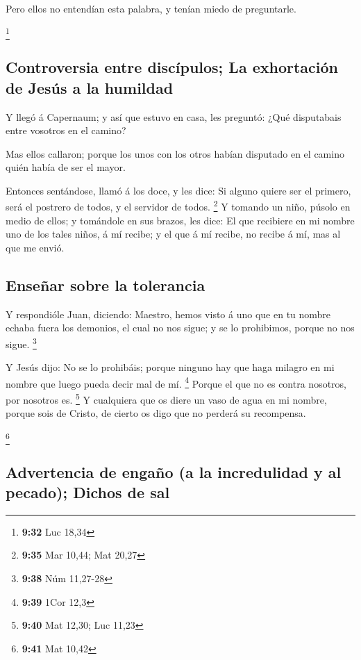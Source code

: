  Pero ellos no entendían esta palabra, y tenían miedo de
preguntarle.

\footnote{\textbf{9:32} Luc 18,34}

\hypertarget{controversia-entre-discuxedpulos-la-exhortaciuxf3n-de-jesuxfas-a-la-humildad}{%
\subsection{Controversia entre discípulos; La exhortación de Jesús a la
humildad}\label{controversia-entre-discuxedpulos-la-exhortaciuxf3n-de-jesuxfas-a-la-humildad}}

 Y llegó á Capernaum; y así que estuvo en casa, les
preguntó: ¿Qué disputabais entre vosotros en el camino?

 Mas ellos callaron; porque los unos con los otros habían
disputado en el camino quién había de ser el mayor.

 Entonces sentándose, llamó á los doce, y les dice: Si
alguno quiere ser el primero, será el postrero de todos, y el servidor
de todos. \footnote{\textbf{9:35} Mar 10,44; Mat 20,27}  Y
tomando un niño, púsolo en medio de ellos; y tomándole en sus brazos,
les dice:  El que recibiere en mi nombre uno de los tales
niños, á mí recibe; y el que á mí recibe, no recibe á mí, mas al que me
envió.

\hypertarget{enseuxf1ar-sobre-la-tolerancia}{%
\subsection{Enseñar sobre la
tolerancia}\label{enseuxf1ar-sobre-la-tolerancia}}

 Y respondióle Juan, diciendo: Maestro, hemos visto á uno
que en tu nombre echaba fuera los demonios, el cual no nos sigue; y se
lo prohibimos, porque no nos sigue. \footnote{\textbf{9:38} Núm 11,27-28}

 Y Jesús dijo: No se lo prohibáis; porque ninguno hay que
haga milagro en mi nombre que luego pueda decir mal de mí. \footnote{\textbf{9:39}
  1Cor 12,3}  Porque el que no es contra nosotros, por
nosotros es. \footnote{\textbf{9:40} Mat 12,30; Luc 11,23} 
Y cualquiera que os diere un vaso de agua en mi nombre, porque sois de
Cristo, de cierto os digo que no perderá su recompensa.

\footnote{\textbf{9:41} Mat 10,42}

\hypertarget{advertencia-de-engauxf1o-a-la-incredulidad-y-al-pecado-dichos-de-sal}{%
\subsection{Advertencia de engaño (a la incredulidad y al pecado);
Dichos de
sal}\label{advertencia-de-engauxf1o-a-la-incredulidad-y-al-pecado-dichos-de-sal}}

